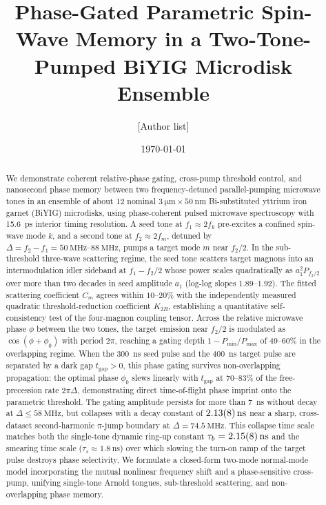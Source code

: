 \documentclass[aps,prb,reprint,superscriptaddress,floatfix]{revtex4-2}
\newcommand{\tgap}{t_{\mathrm{gap}}}
\begin{document}
\title{Phase-Gated Parametric Spin-Wave Memory in a Two-Tone-Pumped BiYIG Microdisk Ensemble}

\author{[Author list]}
\affiliation{[Affiliations]}

\date{\today}

\begin{abstract}
We demonstrate coherent relative-phase gating, cross-pump threshold control, and nanosecond phase memory between two frequency-detuned parallel-pumping microwave tones in an ensemble of about 12 nominal $\SI{3}{\micro\metre}\times\SI{50}{\nano\metre}$ Bi-substituted yttrium iron garnet (BiYIG) microdisks, using phase-coherent pulsed microwave spectroscopy with \SI{15.6}{\pico\second} interior timing resolution. A seed tone at $f_1\approx 2f_k$ pre-excites a confined spin-wave mode $k$, and a second tone at $f_2\approx 2f_m$, detuned by $\Delta=f_2-f_1=\SIrange{50}{88}{\mega\hertz}$, pumps a target mode $m$ near $f_2/2$. In the sub-threshold three-wave scattering regime, the seed tone scatters target magnons into an intermodulation idler sideband at $f_1-f_2/2$ whose power scales quadratically as $a_1^2 P_{f_2/2}$ over more than two decades in seed amplitude $a_1$ (log-log slopes 1.89--1.92). The fitted scattering coefficient $C_m$ agrees within $10\text{--}20\%$ with the independently measured quadratic threshold-reduction coefficient $K_{2B}$, establishing a quantitative self-consistency test of the four-magnon coupling tensor. Across the relative microwave phase $\phi$ between the two tones, the target emission near $f_2/2$ is modulated as $\cos(\phi+\phi_0)$ with period $2\pi$, reaching a gating depth $1-P_{\min}/P_{\max}$ of 49--60\% in the overlapping regime. When the \SI{300}{\nano\second} seed pulse and the \SI{400}{\nano\second} target pulse are separated by a dark gap $\tgap>0$, this phase gating survives non-overlapping propagation: the optimal phase $\phi_0$ slews linearly with $\tgap$ at 70--83\% of the free-precession rate $2\pi\Delta$, demonstrating direct time-of-flight phase imprint onto the parametric threshold. The gating amplitude persists for more than \SI{7}{\nano\second} without decay at $\Delta\le\SI{58}{\mega\hertz}$, but collapses with a decay constant of $\SI{2.13 \pm 0.08}{\nano\second}$ near a sharp, cross-dataset second-harmonic $\pi$-jump boundary at $\Delta=\SI{74.5}{\mega\hertz}$. This collapse time scale matches both the single-tone dynamic ring-up constant $\tau_b=\SI{2.15 \pm 0.08}{\nano\second}$ and the smearing time scale ($\tau_s\approx\SI{1.8}{\nano\second}$) over which slowing the turn-on ramp of the target pulse destroys phase selectivity. We formulate a closed-form two-mode normal-mode model incorporating the mutual nonlinear frequency shift and a phase-sensitive cross-pump, unifying single-tone Arnold tongues, sub-threshold scattering, and non-overlapping phase memory.
\end{abstract}
\end{document}
